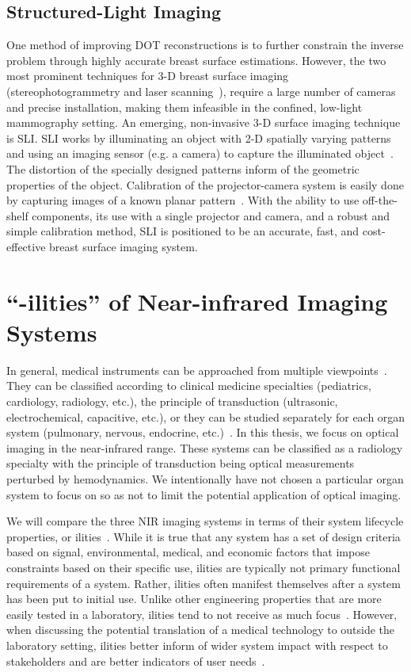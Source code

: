 \subsection{Structured-Light Imaging}
One method of improving \ac{DOT} reconstructions is to further constrain the inverse problem through highly accurate breast surface estimations. However, the two most prominent techniques for 3-D breast surface imaging (stereophotogrammetry and laser scanning~\cite{Yang2015}), require a large number of cameras and precise installation, making them infeasible in the confined, low-light mammography setting. An emerging, non-invasive 3-D surface imaging technique is \ac{SLI}. \ac{SLI} works by illuminating an object with 2-D spatially varying patterns and using an imaging sensor (e.g. a camera) to capture the illuminated object~\cite{Geng2011}. The distortion of the specially designed patterns inform of the geometric properties of the object. Calibration of the projector-camera system is easily done by capturing images of a known planar pattern~\cite{Moreno2012a}. With the ability to use off-the-shelf components, its use with a single projector and camera, and a robust and simple calibration method, SLI is positioned to be an accurate, fast, and cost-effective breast surface imaging system.



\section{``-ilities'' of Near-infrared Imaging Systems}
\label{chap:background:ilities}
In general, medical instruments can be approached from multiple viewpoints~\cite{Webster2010}. They can be classified according to clinical medicine specialties (pediatrics, cardiology, radiology, etc.), the principle of transduction (ultrasonic, electrochemical, capacitive, etc.), or they can be studied separately for each organ system (pulmonary, nervous, endocrine, etc.)~\cite{Bushberg2011}. In this thesis, we focus on optical imaging in the near-infrared range. These systems can be classified as a radiology specialty with the principle of transduction being optical measurements perturbed by hemodynamics. We intentionally have not chosen a particular organ system to focus on so as not to limit the potential application of optical imaging. 

We will compare the three \ac{NIR} imaging systems in terms of their system lifecycle properties, or ilities~\cite{DeWeck2012}. While it is true that any system has a set of design criteria based on signal, environmental, medical, and economic factors that impose constraints based on their specific use, ilities are typically not primary functional requirements of a system. Rather, ilities often manifest themselves after a system has been put to initial use. Unlike other engineering properties that are more easily tested in a laboratory, ilities tend to not receive as much focus~\cite{DeWeck2012}. However, when discussing the potential translation of a medical technology to outside the laboratory setting, ilities better inform of wider system impact with respect to stakeholders and are better indicators of user needs~\cite{DeWeck2011}. 

